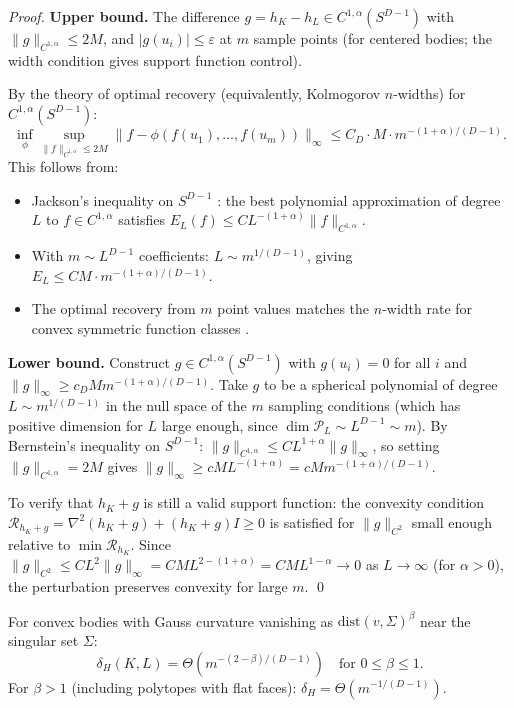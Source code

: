 \begin{proof}
\textbf{Upper bound.} The difference $g = h_K - h_L \in C^{1,\alpha}(S^{D-1})$ with $\|g\|_{C^{1,\alpha}} \leq 2M$, and $|g(u_i)| \leq \varepsilon$ at $m$ sample points (for centered bodies; the width condition gives support function control).

By the theory of optimal recovery (equivalently, Kolmogorov $n$-widths) for $C^{1,\alpha}(S^{D-1})$:
\[
  \inf_{\phi} \sup_{\|f\|_{C^{1,\alpha}} \leq 2M} \|f - \phi(f(u_1), \ldots, f(u_m))\|_\infty \leq C_D \cdot M \cdot m^{-(1+\alpha)/(D-1)}.
\]
This follows from:
\begin{itemize}
  \item Jackson's inequality on $S^{D-1}$ \cite{ragozin1970polynomial, dai2013approximation}: the best polynomial approximation of degree $L$ to $f \in C^{1,\alpha}$ satisfies $E_L(f) \leq C L^{-(1+\alpha)} \|f\|_{C^{1,\alpha}}$.
  \item With $m \sim L^{D-1}$ coefficients: $L \sim m^{1/(D-1)}$, giving $E_L \leq C M \cdot m^{-(1+\alpha)/(D-1)}$.
  \item The optimal recovery from $m$ point values matches the $n$-width rate for convex symmetric function classes \cite{magaril2006optimal}.
\end{itemize}

\textbf{Lower bound.} Construct $g \in C^{1,\alpha}(S^{D-1})$ with $g(u_i) = 0$ for all $i$ and $\|g\|_\infty \geq c_D M m^{-(1+\alpha)/(D-1)}$. Take $g$ to be a spherical polynomial of degree $L \sim m^{1/(D-1)}$ in the null space of the $m$ sampling conditions (which has positive dimension for $L$ large enough, since $\dim \mathcal{P}_L \sim L^{D-1} \sim m$). By Bernstein's inequality on $S^{D-1}$: $\|g\|_{C^{1,\alpha}} \leq C L^{1+\alpha} \|g\|_\infty$, so setting $\|g\|_{C^{1,\alpha}} = 2M$ gives $\|g\|_\infty \geq cM L^{-(1+\alpha)} = cM m^{-(1+\alpha)/(D-1)}$.

To verify that $h_K + g$ is still a valid support function: the convexity condition $\mathcal{R}_{h_K + g} = \nabla^2(h_K + g) + (h_K + g)I \geq 0$ is satisfied for $\|g\|_{C^2}$ small enough relative to $\min \mathcal{R}_{h_K}$. Since $\|g\|_{C^2} \leq CL^2 \|g\|_\infty = CM L^{2-(1+\alpha)} = CM L^{1-\alpha} \to 0$ as $L \to \infty$ (for $\alpha > 0$), the perturbation preserves convexity for large $m$. \qed
\end{proof}

\begin{corollary}
\label{cor:beta}
For convex bodies with Gauss curvature vanishing as $\mathrm{dist}(v, \Sigma)^\beta$ near the singular set $\Sigma$:
\[
  \boxed{\delta_H(K, L) = \Theta\!\left(m^{-(2-\beta)/(D-1)}\right) \quad \text{for } 0 \leq \beta \leq 1.}
\]
For $\beta > 1$ (including polytopes with flat faces): $\delta_H = \Theta(m^{-1/(D-1)})$.
\end{corollary}

